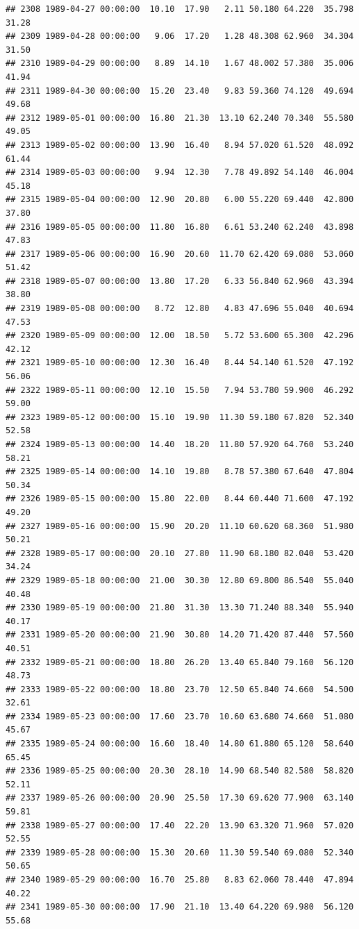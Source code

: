 \documentclass{article}\usepackage{graphicx, color}
\makeatletter
\newenvironment{kframe}{%
 \def\at@end@of@kframe{}%
 \ifinner\ifhmode%
  \def\at@end@of@kframe{\end{minipage}}%
  \begin{minipage}{\columnwidth}%
 \fi\fi%
 \def\FrameCommand##1{\hskip\@totalleftmargin \hskip-\fboxsep
 \colorbox{shadecolor}{##1}\hskip-\fboxsep
     \hskip-\linewidth \hskip-\@totalleftmargin \hskip\columnwidth}%
 \MakeFramed {\advance\hsize-\width
   \@totalleftmargin\z@ \linewidth\hsize
   \@setminipage}}%
 {\par\unskip\endMakeFramed%
 \at@end@of@kframe}
\newenvironment{knitrout}{}{} %
\makeatother
\begin{document}
\begin{knitrout}
\begin{kframe}
\begin{verbatim}
## 2308 1989-04-27 00:00:00  10.10  17.90   2.11 50.180 64.220  35.798  31.28
## 2309 1989-04-28 00:00:00   9.06  17.20   1.28 48.308 62.960  34.304  31.50
## 2310 1989-04-29 00:00:00   8.89  14.10   1.67 48.002 57.380  35.006  41.94
## 2311 1989-04-30 00:00:00  15.20  23.40   9.83 59.360 74.120  49.694  49.68
## 2312 1989-05-01 00:00:00  16.80  21.30  13.10 62.240 70.340  55.580  49.05
## 2313 1989-05-02 00:00:00  13.90  16.40   8.94 57.020 61.520  48.092  61.44
## 2314 1989-05-03 00:00:00   9.94  12.30   7.78 49.892 54.140  46.004  45.18
## 2315 1989-05-04 00:00:00  12.90  20.80   6.00 55.220 69.440  42.800  37.80
## 2316 1989-05-05 00:00:00  11.80  16.80   6.61 53.240 62.240  43.898  47.83
## 2317 1989-05-06 00:00:00  16.90  20.60  11.70 62.420 69.080  53.060  51.42
## 2318 1989-05-07 00:00:00  13.80  17.20   6.33 56.840 62.960  43.394  38.80
## 2319 1989-05-08 00:00:00   8.72  12.80   4.83 47.696 55.040  40.694  47.53
## 2320 1989-05-09 00:00:00  12.00  18.50   5.72 53.600 65.300  42.296  42.12
## 2321 1989-05-10 00:00:00  12.30  16.40   8.44 54.140 61.520  47.192  56.06
## 2322 1989-05-11 00:00:00  12.10  15.50   7.94 53.780 59.900  46.292  59.00
## 2323 1989-05-12 00:00:00  15.10  19.90  11.30 59.180 67.820  52.340  52.58
## 2324 1989-05-13 00:00:00  14.40  18.20  11.80 57.920 64.760  53.240  58.21
## 2325 1989-05-14 00:00:00  14.10  19.80   8.78 57.380 67.640  47.804  50.34
## 2326 1989-05-15 00:00:00  15.80  22.00   8.44 60.440 71.600  47.192  49.20
## 2327 1989-05-16 00:00:00  15.90  20.20  11.10 60.620 68.360  51.980  50.21
## 2328 1989-05-17 00:00:00  20.10  27.80  11.90 68.180 82.040  53.420  34.24
## 2329 1989-05-18 00:00:00  21.00  30.30  12.80 69.800 86.540  55.040  40.48
## 2330 1989-05-19 00:00:00  21.80  31.30  13.30 71.240 88.340  55.940  40.17
## 2331 1989-05-20 00:00:00  21.90  30.80  14.20 71.420 87.440  57.560  40.51
## 2332 1989-05-21 00:00:00  18.80  26.20  13.40 65.840 79.160  56.120  48.73
## 2333 1989-05-22 00:00:00  18.80  23.70  12.50 65.840 74.660  54.500  32.61
## 2334 1989-05-23 00:00:00  17.60  23.70  10.60 63.680 74.660  51.080  45.67
## 2335 1989-05-24 00:00:00  16.60  18.40  14.80 61.880 65.120  58.640  65.45
## 2336 1989-05-25 00:00:00  20.30  28.10  14.90 68.540 82.580  58.820  52.11
## 2337 1989-05-26 00:00:00  20.90  25.50  17.30 69.620 77.900  63.140  59.81
## 2338 1989-05-27 00:00:00  17.40  22.20  13.90 63.320 71.960  57.020  52.55
## 2339 1989-05-28 00:00:00  15.30  20.60  11.30 59.540 69.080  52.340  50.65
## 2340 1989-05-29 00:00:00  16.70  25.80   8.83 62.060 78.440  47.894  40.22
## 2341 1989-05-30 00:00:00  17.90  21.10  13.40 64.220 69.980  56.120  55.68

\end{verbatim}
\end{kframe}
\end{knitrout}
\end{document}
